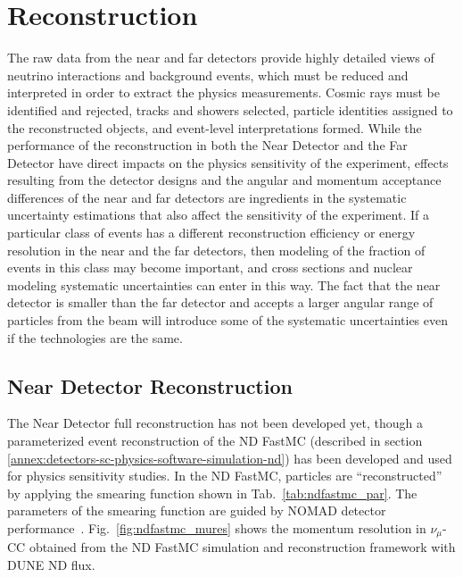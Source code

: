\chapter{Reconstruction}
\label{annex:detectors-sc-physics-software-reconstruction}

The raw data from the near and far detectors provide highly detailed views of neutrino
interactions and background events, which must be reduced and interpreted in order to
extract the physics measurements.  Cosmic rays must be identified and rejected, tracks and
showers selected, particle identities assigned to the reconstructed objects, and event-level
interpretations formed.  While the performance of the reconstruction in both the Near Detector
and the Far Detector have direct impacts on the physics sensitivity of the experiment, effects
resulting from the detector designs and the angular and momentum acceptance differences of the
near and far detectors are ingredients in the systematic uncertainty estimations that also
affect the sensitivity of the experiment.  If a particular class of events has a different
reconstruction efficiency or energy resolution in the near and the far detectors, then modeling of the fraction of events
in this class may become important, and cross sections and nuclear modeling systematic uncertainties
can enter in this way.  The fact that the near detector is smaller than the far detector and accepts a larger
angular range of particles from the beam will introduce some of the systematic uncertainties even if the
technologies are the same. 

\section{Near Detector Reconstruction}
\label{annex:detectors-sc-physics-software-reconstruction-nd}

The Near Detector full reconstruction has not been developed yet, though a parameterized event
reconstruction of the ND FastMC (described in section \ref{annex:detectors-sc-physics-software-simulation-nd})
has been developed and used for physics sensitivity studies.  In the ND FastMC, particles are ``reconstructed''
by applying the smearing function shown in Tab.~\ref{tab:ndfastmc_par}.  The parameters of the smearing
function are guided by NOMAD detector performance~\cite{Anfreville:2001zi}.  Fig.~\ref{fig:ndfastmc_mures} shows
the momentum resolution in $\nu_\mu$-CC obtained from the ND FastMC simulation and reconstruction framework with DUNE ND flux.

